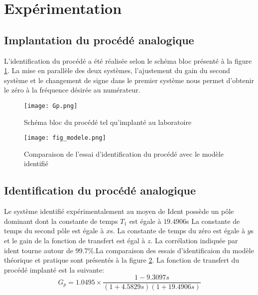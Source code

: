 \section{Expérimentation}
\subsection{Implantation du procédé analogique}
L'identification du procédé a été réalisée selon le schéma bloc présenté à la figure \ref{fig5}. La mise en parallèle des deux systèmes, l'ajustement du gain du second système et le changement de signe dans le premier système nous permet d'obtenir le zéro à la fréquence désirée au numérateur. 

\begin{figure}[htb]
\centering
\texttt{[image: Gp.png]}
\caption{Schéma bloc du procédé tel qu'implanté au laboratoire}
\label{fig5}
\end{figure}
\begin{figure}[htb]
\centering
\texttt{[image: fig\_modele.png]}
\caption{Comparaison de l'essai d'identification du procédé avec le modèle identifié}
\label{fig7}
\end{figure}
\subsection{Identification du procédé analogique}
\label{identification_procede_analogique}
Le système identifié expérimentalement au moyen de Ident possède un pôle dominant dont la constante de temps $T_1$ est égale à $19.4906$s La constante de temps du second pôle est égale à $x$s. La constante de temps du zéro est égale à $y$s et le gain de la fonction de transfert est égal à $z$. La corrélation indiquée par ident tourne autour de 99.7\%.La comparaison des essais d'identificaion du modèle théorique et pratique sont présentés à la figure \ref{fig7}. La fonction de transfert du procédé implanté est la suivante:
\begin{equation}
\label{eq1}
G_p = 1.0495 \times \frac{1-9.3097s}{(1+4.5829s)(1+19.4906s)}
\end{equation} 

